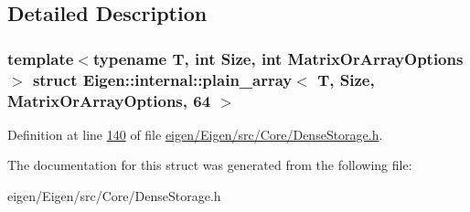 \subsection{Detailed Description}
\subsubsection*{template$<$typename T, int Size, int Matrix\+Or\+Array\+Options$>$\newline
struct Eigen\+::internal\+::plain\+\_\+array$<$ T, Size, Matrix\+Or\+Array\+Options, 64 $>$}



Definition at line \hyperlink{eigen_2_eigen_2src_2_core_2_dense_storage_8h_source_l00140}{140} of file \hyperlink{eigen_2_eigen_2src_2_core_2_dense_storage_8h_source}{eigen/\+Eigen/src/\+Core/\+Dense\+Storage.\+h}.



The documentation for this struct was generated from the following file\+:\begin{DoxyCompactItemize}
\item 
eigen/\+Eigen/src/\+Core/\+Dense\+Storage.\+h\end{DoxyCompactItemize}
